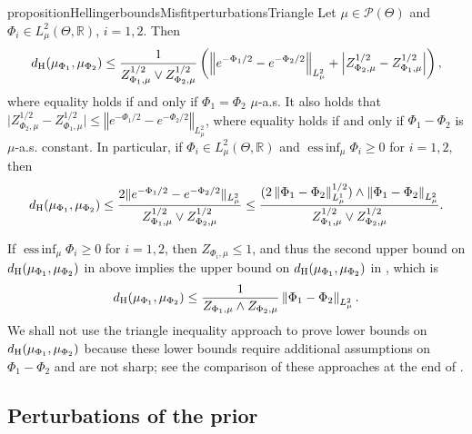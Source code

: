 \documentclass[a4paper]{scrartcl}
\theoremstyle{definition}
\numberwithin{equation}{section}
\newcommand{\R}{\mathbb{R}}
\DeclareMathOperator*{\essinf}{ess\,inf}
\newcommand{\abs}[1]{\vert #1\vert}
\newcommand{\Abs}[1]{\left\vert#1\right\vert}
\newcommand{\norm}[1]{\Vert #1 \Vert}
\newcommand{\Norm}[1]{\left\Vert #1 \right\Vert}
\newcommand{\Hel}[0]{\textup{H}}
\begin{document}
\begin{restatable}{proposition}{HellingerboundsMisfitperturbationsTriangle}
 \label{proposition_Hellinger_upper_bound_misfit_perturbations_via_triangle_inequality}
 Let $\mu\in\mathcal{P}(\Theta)$ and $\Phi_i\in L^2_\mu(\Theta,\R)$, $i=1,2$. 
 Then
 \begin{equation*}
d_{\Hel}(\mu_{\Phi_1},\mu_{\Phi_2})\leq \frac{1}{Z_{\Phi_1,\mu}^{1/2}\vee Z_{\Phi_2,\mu}^{1/2}}\left( \Norm{e^{-\Phi_1/2}-e^{-\Phi_2/2}}_{L^2_\mu}+\Abs{Z_{\Phi_2,\mu}^{1/2}-Z_{\Phi_1,\mu}^{1/2}}\right),
 \end{equation*}
 where equality holds if and only if $\Phi_1=\Phi_2$ $\mu$-a.s.
  It also holds that $ \abs{Z_{\Phi_2,\mu}^{1/2}-Z_{\Phi_1,\mu}^{1/2}}\leq  \Norm{e^{-\Phi_1/2}-e^{-\Phi_2/2}}_{L^2_\mu}$, where equality holds if and only if $\Phi_1-\Phi_2$ is $\mu$-a.s. constant.
 In particular, if $\Phi_i\in L^2_\mu(\Theta,\R)$ and $\essinf_\mu\Phi_i\geq 0$ for $i=1,2$, then
 \begin{equation*}
d_{\Hel}(\mu_{\Phi_1},\mu_{\Phi_2})\leq\frac{2\norm{e^{-\Phi_1/2}-e^{-\Phi_2/2}}_{L^2_\mu}}{Z_{\Phi_1,\mu}^{1/2}\vee Z_{\Phi_2,\mu}^{1/2}}\leq  \frac{(2\Norm{\Phi_1-\Phi_2}_{L^1_\mu}^{1/2})\wedge \Norm{\Phi_1-\Phi_2}_{L^2_\mu}}{Z_{\Phi_1,\mu}^{1/2}\vee Z_{\Phi_2,\mu}^{1/2}}.
 \end{equation*}
\end{restatable}
If $\essinf_\mu\Phi_i\geq 0$ for $i=1,2$, then $Z_{\Phi_i,\mu}\leq 1$, and thus the second upper bound on $d_{\Hel}(\mu_{\Phi_1},\mu_{\Phi_2})$ in   above implies the upper bound on $d_{\Hel}(\mu_{\Phi_1},\mu_{\Phi_2})$ in \cite[Theorem 5]{Sprungk2020}, which is
\begin{equation*}
 d_{\Hel}(\mu_{\Phi_1},\mu_{\Phi_2})\leq \frac{1}{Z_{\Phi_1,\mu}\wedge Z_{\Phi_2,\mu}}\Norm{\Phi_1-\Phi_2}_{L^2_\mu}.
\end{equation*}
We shall not use the triangle inequality approach to prove lower bounds on $d_{\Hel}(\mu_{\Phi_1},\mu_{\Phi_2})$ because these lower bounds require additional assumptions on $\Phi_1-\Phi_2$ and are not sharp; see the comparison of these approaches at the end of .

\subsection{Perturbations of the prior}
\label{sectionHellingerbounds_prior_perturbation}
\end{document}
